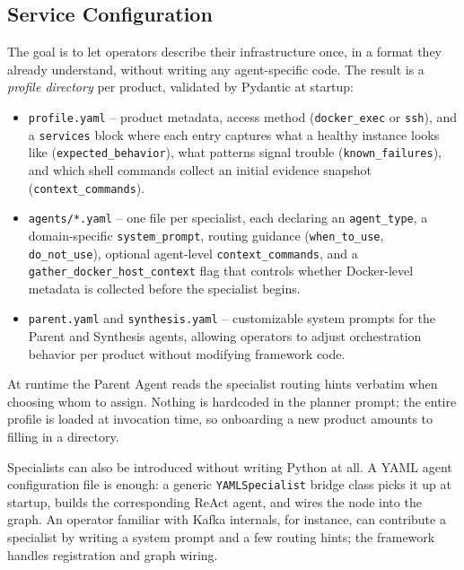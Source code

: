 \documentclass[conference]{IEEEtran}
\begin{document}
\subsection{Service Configuration}

The goal is to let operators describe their infrastructure once, in a
format they already understand, without writing any agent-specific code. The
result is a \emph{profile directory} per product, validated by Pydantic
at startup:

\begin{itemize}
  \item \texttt{profile.yaml} -- product metadata, access method
        (\texttt{docker\_exec} or \texttt{ssh}), and a
        \texttt{services} block where each entry captures what a
        healthy instance looks like (\texttt{expected\_behavior}),
        what patterns signal trouble (\texttt{known\_failures}),
        and which shell commands collect an initial evidence snapshot
        (\texttt{context\_commands}).
  \item \texttt{agents/*.yaml} -- one file per specialist, each
        declaring an \texttt{agent\_type}, a domain-specific
        \texttt{system\_prompt}, routing guidance
        (\texttt{when\_to\_use}, \texttt{do\_not\_use}),
        optional agent-level \texttt{context\_commands}, and a
        \texttt{gather\_docker\_host\_context} flag that controls
        whether Docker-level metadata is collected before the
        specialist begins.
  \item \texttt{parent.yaml} and \texttt{synthesis.yaml} -- customizable
        system prompts for the Parent and Synthesis agents, allowing
        operators to adjust orchestration behavior per product
        without modifying framework code.
\end{itemize}

At runtime the Parent Agent reads the specialist routing hints
verbatim when choosing whom to assign. Nothing is hardcoded in the
planner prompt; the entire profile is loaded at invocation time, so
onboarding a new product amounts to filling in a directory.

Specialists can also be introduced without writing Python at all. A
YAML agent configuration file is enough: a generic
\texttt{YAMLSpecialist} bridge class picks it up at startup,
builds the corresponding ReAct agent, and wires the node into the
graph. An operator familiar with Kafka internals, for instance, can
contribute a specialist by writing a system prompt and a few routing
hints; the framework handles registration and graph wiring.
\end{document}
